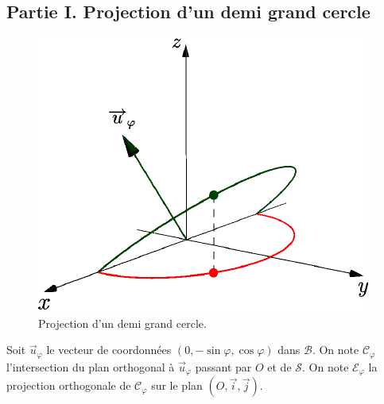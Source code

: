 \subsection*{Partie I. Projection d'un demi grand cercle}
\begin{figure}[h!t]
 \centering
 \includegraphics{./Eintcurv_2.pdf}
 \caption{Projection d'un demi grand cercle.}
 \label{fig:Eintcurv_2}
\end{figure}
Soit $\overrightarrow{u}_\varphi$ le vecteur de coordonnées $(0,-\sin \varphi, \cos \varphi)$ dans $\mathcal{B}$. On note $\mathcal{C}_\varphi$ l'intersection du plan orthogonal à $\overrightarrow{u}_\varphi$ passant par $O$ et de $\mathcal{S}$. On note $\mathcal{E}_\varphi$ la projection orthogonale de $\mathcal{C}_\varphi$ sur le plan $(O,\overrightarrow{i},\overrightarrow{j})$.
